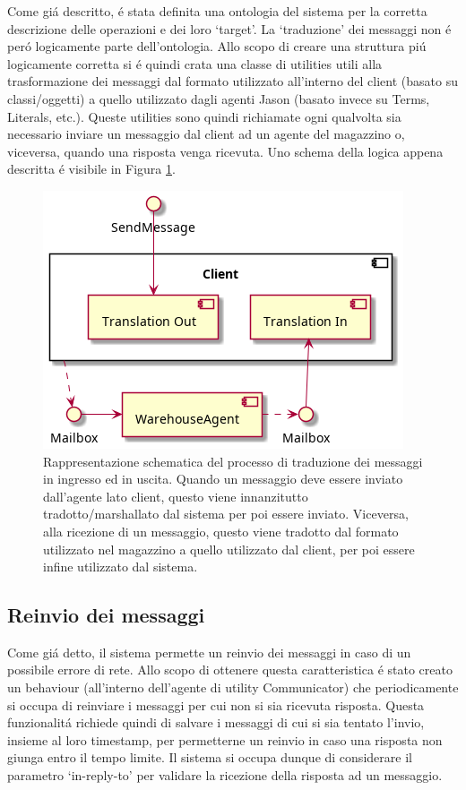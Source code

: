Come gi\'a descritto, \'e stata definita una ontologia del sistema per la corretta descrizione delle operazioni e dei loro `target'. La `traduzione' dei messaggi non \'e per\'o logicamente parte dell'ontologia. Allo scopo di creare una struttura pi\'u logicamente corretta si \'e quindi crata una classe di utilities utili alla trasformazione dei messaggi dal formato utilizzato all'interno del client (basato su classi/oggetti) a quello utilizzato dagli agenti Jason (basato invece su Terms, Literals, etc.). Queste utilities sono quindi richiamate ogni qualvolta sia necessario inviare un messaggio dal client ad un agente del magazzino o, viceversa, quando una risposta venga ricevuta. Uno schema della logica appena descritta \'e visibile in Figura \ref{fig:message-translation}.
\begin{figure}[!ht]\centering
    \includegraphics[width=.7\textwidth]{section/implementation/figure/message-translation.png}
    \caption{Rappresentazione schematica del processo di traduzione dei messaggi in ingresso ed in uscita. Quando un messaggio deve essere inviato dall'agente lato client, questo viene innanzitutto tradotto/marshallato dal sistema per poi essere inviato. Viceversa, alla ricezione di un messaggio, questo viene tradotto dal formato utilizzato nel magazzino a quello utilizzato dal client, per poi essere infine utilizzato dal sistema.}
    \label{fig:message-translation}
\end{figure}

\subsection{Reinvio dei messaggi}
Come gi\'a detto, il sistema permette un reinvio dei messaggi in caso di un possibile errore di rete. Allo scopo di ottenere questa caratteristica \'e stato creato un behaviour (all'interno dell'agente di utility Communicator) che periodicamente si occupa di reinviare i messaggi per cui non si sia ricevuta risposta. Questa funzionalit\'a richiede quindi di salvare i messaggi di cui si sia tentato l'invio, insieme al loro timestamp, per permetterne un reinvio in caso una risposta non giunga entro il tempo limite. Il sistema si occupa dunque di considerare il parametro `in-reply-to' per validare la ricezione della risposta ad un messaggio.


